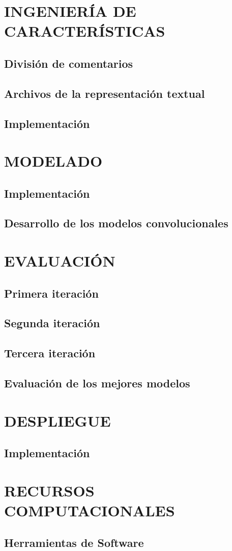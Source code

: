 \section{INGENIERÍA DE CARACTERÍSTICAS}

\subsection{División de comentarios}

\subsection{Archivos de la representación textual}

\subsection{Implementación}

\section{MODELADO}

\subsection{Implementación}

\subsection{Desarrollo de los modelos convolucionales}


\section{EVALUACIÓN}

\subsection{Primera iteración}

\subsection{Segunda iteración}

\subsection{Tercera iteración}

\subsection{Evaluación de los mejores modelos}

\section{DESPLIEGUE}

\subsection{Implementación}

\section{RECURSOS COMPUTACIONALES}

\subsection{Herramientas de Software}





